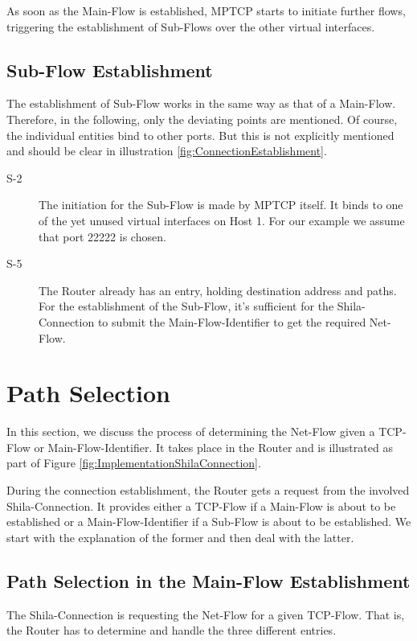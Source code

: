 As soon as the Main-Flow is established, MPTCP starts to initiate further flows, triggering the establishment of Sub-Flows over the other virtual interfaces.

\subsection{Sub-Flow Establishment}

The establishment of Sub-Flow works in the same way as that of a Main-Flow. Therefore, in the following, only the deviating points are mentioned. Of course, the individual entities bind to other ports. But this is not explicitly mentioned and should be clear in illustration \ref{fig:ConnectionEstablishment}.

\begin{description}	
\item[S-2] The initiation for the Sub-Flow is made by MPTCP itself. It binds to one of the yet unused virtual interfaces on Host 1. For our example we assume that port 22222 is chosen. 
\item[S-5] The Router already has an entry, holding destination address and paths. For the establishment of the Sub-Flow, it's sufficient for the Shila-Connection to submit the Main-Flow-Identifier to get the required Net-Flow.
\end{description}

\newpage
\section{Path Selection}
\label{sec:ImplementationPathSelection}

In this section, we discuss the process of determining the Net-Flow given a TCP-Flow or Main-Flow-Identifier. It takes place in the Router and is illustrated as part of Figure \ref{fig:ImplementationShilaConnection}.

During the connection establishment, the Router gets a request from the involved Shila-Connection. It provides either a TCP-Flow if a Main-Flow is about to be established or a Main-Flow-Identifier if a Sub-Flow is about to be established. We start with the explanation of the former and then deal with the latter.

\subsection*{Path Selection in the Main-Flow Establishment}

The Shila-Connection is requesting the Net-Flow for a given TCP-Flow. That is, the Router has to determine and handle the three different entries.

